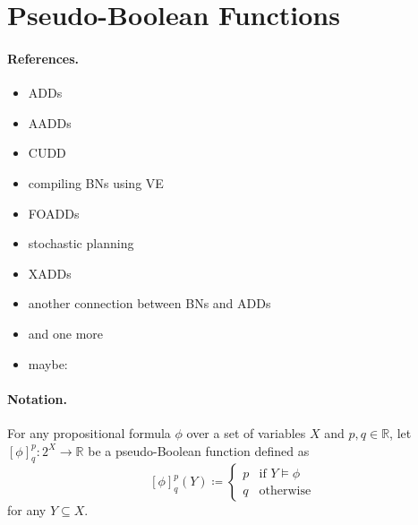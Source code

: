 \documentclass[runningheads]{llncs}
\begin{document}
\section{Pseudo-Boolean Functions} %

\paragraph{References.} %
\begin{itemize}
\item ADDs \cite{DBLP:journals/fmsd/BaharFGHMPS97}
\item AADDs \cite{DBLP:conf/ijcai/SannerM05}
\item CUDD \cite{somenzi1998cudd}
\item compiling BNs using VE \cite{DBLP:conf/ijcai/ChaviraD07}
\item FOADDs \cite{DBLP:journals/ai/SannerB09}
\item stochastic planning \cite{DBLP:conf/uai/HoeySHB99}
\item XADDs \cite{DBLP:conf/uai/SannerDB11}
\item another connection between BNs and ADDs \cite{DBLP:conf/icml/ZhaoMP15}
\item and one more \cite{DBLP:conf/uai/GogateD11}
\item maybe: \cite{DBLP:conf/aaai/FargierMNS14}
\end{itemize}

\paragraph{Notation.} For any propositional formula $\phi$ over a set of
variables $X$ and $p, q \in \mathbb{R}$, let $[\phi]^p_q\colon 2^X \to
\mathbb{R}$ be a pseudo-Boolean function defined as
\[
  [\phi]^p_q(Y) \coloneqq
  \begin{cases}
    p & \text{if } Y \models \phi \\
    q & \text{otherwise}
  \end{cases}
\]
for any $Y \subseteq X$.
\end{document}
